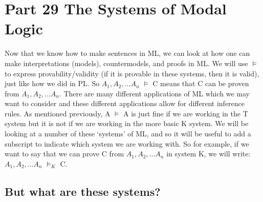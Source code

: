 \chapter{Part 29 The Systems of Modal Logic}
Now that we know how to make sentences in ML, we can look at how one can make interpretations (models), countermodels, and proofs in ML. We will use $\vDash$  to express provability/validity (if it is provable in these systems, then it is valid), just like how we did in PL. So $A_1,A_2,\ldots A_n$ $\vDash$  C means that C can be proven from $A_1,A_2,\ldots A_n$. There are many different applications of ML which we may want to consider and these different applications allow for different inference rules. As mentioned previously, \ebox A $\vDash$ A is just fine if we are working in the T system but it is not if we are working in the more basic K system. We will be looking at a number of these `systems' of ML, and so it will be useful to add a subscript to indicate which system we are working with. So for example, if we want to say that we can prove C from $A_1,A_2,\ldots A_n$ in system K, we will write: $A_1,A_2,\ldots A_n$ $\vDash_K$ C.

\section{But what are these systems?}

